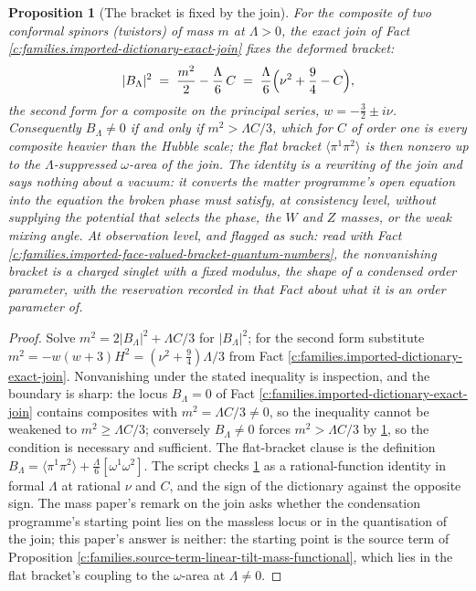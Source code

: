 \documentclass[11pt]{article}
\newtheorem{proposition}[theorem]{Proposition}
\theoremstyle{definition}
\theoremstyle{plain}
\newcommand{\changedmark}[2]{\marginpar{\raggedright\scriptsize\color{#1}#2}}
\providecommand{\br}{}\renewcommand{\br}[1]{\langle #1\rangle}
\begin{document}
\begin{proposition}[The bracket is fixed by the join]\label{c:families.bracket-fixed-join}
\changedmark{gray}{reworded}
For the composite of two conformal spinors (twistors) of mass $m$ at $\Lambda > 0$, the exact join of Fact \ref{c:families.imported-dictionary-exact-join} fixes the deformed bracket:
\begin{equation}
|B_{\Lambda}|^{2} \;=\; \frac{m^{2}}{2} - \frac{\Lambda}{6}\,C \;=\; \frac{\Lambda}{6}\Bigl(\nu^{2} + \frac{9}{4} - C\Bigr),
\end{equation}
the second form for a composite on the principal series, $w = -\tfrac32 \pm i\nu$. Consequently $B_{\Lambda} \ne 0$ if and only if $m^{2} > \Lambda C/3$, which for $C$ of order one is every composite heavier than the Hubble scale; the flat bracket $\br{\pi^{1}\pi^{2}}$ is then nonzero up to the $\Lambda$-suppressed $\omega$-area of the join. The identity is a rewriting of the join and says nothing about a vacuum: it converts the matter programme's open equation into the equation the broken phase must satisfy, at consistency level, without supplying the potential that selects the phase, the $W$ and $Z$ masses, or the weak mixing angle. At observation level, and flagged as such: read with Fact \ref{c:families.imported-face-valued-bracket-quantum-numbers}, the nonvanishing bracket is a charged singlet with a fixed modulus, the shape of a condensed order parameter, with the reservation recorded in that Fact about what it is an order parameter \emph{of}.
\end{proposition}
\begin{proof}
Solve $m^{2} = 2|B_{\Lambda}|^{2} + \Lambda C/3$ for $|B_{\Lambda}|^{2}$; for the second form substitute $m^{2} = -w(w+3)H^{2} = (\nu^{2} + \tfrac94)\Lambda/3$ from Fact \ref{c:families.imported-dictionary-exact-join}. Nonvanishing under the stated inequality is inspection, and the boundary is sharp: the locus $B_{\Lambda} = 0$ of Fact \ref{c:families.imported-dictionary-exact-join} contains composites with $m^{2} = \Lambda C/3 \ne 0$, so the inequality cannot be weakened to $m^{2} \ge \Lambda C/3$; conversely $B_{\Lambda} \ne 0$ forces $m^{2} > \Lambda C/3$ by \ref{c:families.bracket-fixed-join}, so the condition is necessary and sufficient. The flat-bracket clause is the definition $B_{\Lambda} = \br{\pi^{1}\pi^{2}} + \tfrac{\Lambda}{6}[\omega^{1}\omega^{2}]$. The script checks \ref{c:families.bracket-fixed-join} as a rational-function identity in formal $\Lambda$ at rational $\nu$ and $C$, and the sign of the dictionary against the opposite sign. The mass paper's remark on the join \cite[Rem.~5.10]{ButlerT11} asks whether the condensation programme's starting point lies on the massless locus or in the quantisation of the join; this paper's answer is neither: the starting point is the source term of Proposition \ref{c:families.source-term-linear-tilt-mass-functional}, which lies in the flat bracket's coupling to the $\omega$-area at $\Lambda \ne 0$.

\end{proof}
\end{document}
